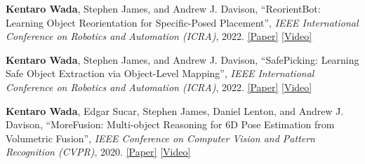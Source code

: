 \documentclass[letterpaper,MMMyyyy,nonstop]{simpleresumecv}
\begin{document}
\begin{body}
\textbf{Kentaro Wada}, Stephen James, and Andrew J. Davison,
``ReorientBot: Learning Object Reorientation for Specific-Posed Placement'',
\textit{IEEE International Conference on Robotics and Automation (ICRA)}, 2022.
\href{https://arxiv.org/abs/2202.11092}{\underline{[Paper]}}
\href{https://youtu.be/ahWN84sWWJU}{\underline{[Video]}}

\textbf{Kentaro Wada}, Stephen James, and Andrew J. Davison,
``SafePicking: Learning Safe Object Extraction via Object-Level Mapping'',
\textit{IEEE International Conference on Robotics and Automation (ICRA)}, 2022.
\href{https://arxiv.org/abs/2202.05832}{\underline{[Paper]}}
\href{https://youtu.be/ejjqiBqRRKo}{\underline{[Video]}}

\textbf{Kentaro Wada}, Edgar Sucar, Stephen James, Daniel Lenton, and Andrew J.
Davison,
``MoreFusion: Multi-object Reasoning for 6D Pose Estimation from Volumetric
Fusion'',
\textit{IEEE Conference on Computer Vision and Pattern Recognition (CVPR)}, 2020.
\href{https://arxiv.org/abs/2004.04336}{\underline{[Paper]}}
\href{https://youtu.be/6oLUhuZL4ko}{\underline{[Video]}}


\GapNoBreak



\end{body}
\end{document}
